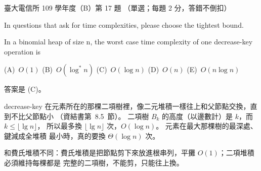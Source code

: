 \begin{pastexam}[label={px:ntu-109-comm-dsa-17}]{臺大電信所 109 學年度（B）第 17 題}
（單選；每題 2 分，答錯不倒扣）

In questions that ask for time complexities, please choose the tightest bound.

In a binomial heap of size n, the worst case time complexity of one decrease-key operation is

(A)~$O(1)$ \qquad (B)~$O(\log^* n)$ \qquad (C)~$O(\log n)$ \qquad (D)~$O(n)$ \qquad (E)~$O(n\log n)$
\end{pastexam}

\begin{pastsoln}
答案是 (C)。

decrease-key 在元素所在的那棵二項樹裡，像二元堆積一樣往上和父節點交換，直到不比父節點小
（資結書第~8.5~節）。 二項樹 $B_k$ 的高度（以邊數計）是 $k$，而 $k \le \lfloor \lg n \rfloor$，
所以最多換 $\lfloor \lg n \rfloor$ 次，$O(\log n)$。 元素在最大那棵樹的最深處、鍵減成全堆積
最小時，真的要換 $\Theta(\log n)$ 次。

和費氏堆積不同：費氏堆積是把節點剪下來放進根串列，平攤 $O(1)$；二項堆積必須維持每棵都是
完整的二項樹，不能剪，只能往上換。
\end{pastsoln}
